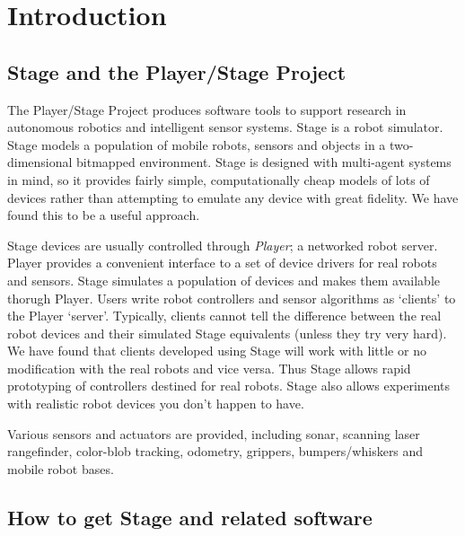 \documentclass[11pt,twoside]{report}
\begin{document}
\setcounter{page}{0}


\chapter{Introduction}

\section{ Stage and the Player/Stage Project}

The Player/Stage Project produces software tools to support research
in autonomous robotics and intelligent sensor systems. Stage is a
robot simulator. Stage models a population of mobile robots, sensors
and objects in a two-dimensional bitmapped environment. Stage is
designed with multi-agent systems in mind, so it provides fairly
simple, computationally cheap models of lots of devices rather than
attempting to emulate any device with great fidelity. We have found
this to be a useful approach.

Stage devices are usually controlled through \emph{Player}; a
networked robot server. Player provides a convenient interface to a
set of device drivers for real robots and sensors. Stage simulates a
population of devices and makes them available thorugh Player. Users
write robot controllers and sensor algorithms as `clients' to the
Player `server'. Typically, clients cannot tell the difference between
the real robot devices and their simulated Stage equivalents (unless
they try very hard). We have found that clients developed using Stage
will work with little or no modification with the real robots and vice
versa. Thus Stage allows rapid prototyping of controllers destined for
real robots. Stage also allows experiments with realistic robot
devices you don't happen to have.
  
Various sensors and actuators are provided, including sonar, scanning
laser rangefinder, color-blob tracking, odometry, grippers,
bumpers/whiskers and mobile robot bases.

  \section{How to get Stage and related software}
\end{document}
